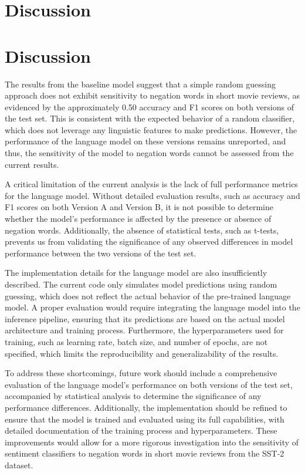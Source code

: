 \documentclass{article}
\begin{document}
\section{Discussion}
\section{Discussion}

The results from the baseline model suggest that a simple random guessing approach does not exhibit sensitivity to negation words in short movie reviews, as evidenced by the approximately 0.50 accuracy and F1 scores on both versions of the test set. This is consistent with the expected behavior of a random classifier, which does not leverage any linguistic features to make predictions. However, the performance of the language model on these versions remains unreported, and thus, the sensitivity of the model to negation words cannot be assessed from the current results.

A critical limitation of the current analysis is the lack of full performance metrics for the language model. Without detailed evaluation results, such as accuracy and F1 scores on both Version A and Version B, it is not possible to determine whether the model's performance is affected by the presence or absence of negation words. Additionally, the absence of statistical tests, such as t-tests, prevents us from validating the significance of any observed differences in model performance between the two versions of the test set.

The implementation details for the language model are also insufficiently described. The current code only simulates model predictions using random guessing, which does not reflect the actual behavior of the pre-trained language model. A proper evaluation would require integrating the language model into the inference pipeline, ensuring that its predictions are based on the actual model architecture and training process. Furthermore, the hyperparameters used for training, such as learning rate, batch size, and number of epochs, are not specified, which limits the reproducibility and generalizability of the results.

To address these shortcomings, future work should include a comprehensive evaluation of the language model's performance on both versions of the test set, accompanied by statistical analysis to determine the significance of any performance differences. Additionally, the implementation should be refined to ensure that the model is trained and evaluated using its full capabilities, with detailed documentation of the training process and hyperparameters. These improvements would allow for a more rigorous investigation into the sensitivity of sentiment classifiers to negation words in short movie reviews from the SST-2 dataset.
\end{document}
